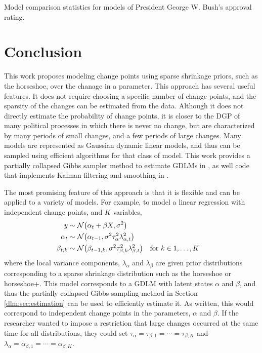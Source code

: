 \begin{table}[thbp!]
  \centering
  
  \caption{Model comparison statistics for models of President George W. Bush's approval rating.}
  \label{dlm:tab:bush_model_comp}
\end{table}



\section{Conclusion}
\label{dlm:sec:conclusion}


This work proposes modeling change points using sparse shrinkage priors, such as the horseshoe, over the chanage in a parameter.
This approach has several useful features. 
It does not require choosing a specific number of change points, and the sparsity of the changes can be estimated from the data.
Although it does not directly estimate the probability of change points, it is closer to the DGP of many political processes in which there is never no change, but are characterized by many periods of small changes, and a few periods of large changes.
Many models are represented as Gaussian dynamic linear models, and thus can be sampled using efficient algorithms for that class of model.
This work provides a partially collapsed Gibbs sampler method to estimate GDLMs in \Stan{}, as well \Stan{} code that implements Kalman filtering and smoothing in \Stan{}.

The most promising feature of this approach is that it is flexible and can be applied to a variety of models.
For example, to model a linear regression with independent change points, and $K$ variables,
\begin{equation}
  \label{dlm:eq:32}
  \begin{aligned}[t]
  y & \sim \mathcal{N}\mathopen{}\left(\alpha_{t} + \beta X, \sigma^{2}\right)\mathclose{} \\
  \alpha_{t} & \sim \mathcal{N}\mathopen{}\left(\alpha_{t-1}, \sigma^{2} \tau_{\alpha}^{2} \lambda_{\alpha,t}^{2}\right)\mathclose{} \\
  \beta_{t,k} & \sim \mathcal{N}\mathopen{}\left(\beta_{t-1,k}, \sigma^{2} \tau_{\beta, k}^{2} \lambda_{\beta,t}^{2}\right)\mathclose{} &&\text{for $k \in 1, \dots, K$}
  \end{aligned}
\end{equation}
where the local variance components, $\lambda_{\alpha}$ and $\lambda_{\beta}$ are given prior distributions corresponding to a sparse shrinkage distribution such as the horseshoe or horseshoe+.
This model corresponds to a GDLM with latent states $\alpha$ and $\beta$, and thus the partially collapsed Gibbs sampling method in Section \ref{dlm:sec:estimation} can be used to efficiently estimate it.
As written, this would correspond to independent change points in the parameters, $\alpha$ and $\beta$. 
If the researcher wanted to impose a restriction that large changes occurred at the same time for all distributions, they could set $\tau_{\alpha} = \tau_{\beta,1} = \cdots = \tau_{\beta, K}$ and $\lambda_{\alpha} = \alpha_{\beta,1} = \cdots = \alpha_{\beta, K}$.




